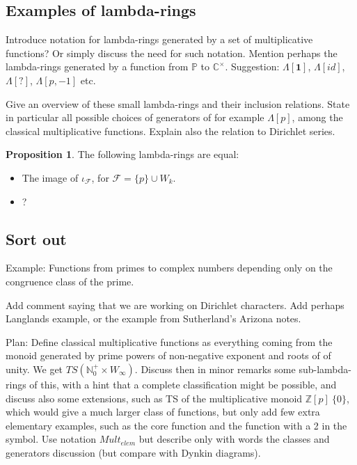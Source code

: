 \documentclass[a4paper]{article}
\theoremstyle{definition}
\newtheorem{proposition}[theorem]{Proposition}
\theoremstyle{remark}
\begin{document}
\subsection{Examples of lambda-rings}

Introduce notation for lambda-rings generated by a set of multiplicative functions? Or simply discuss the need for such notation. Mention perhaps the lambda-rings generated by a function from $\mathbb{P}$ to $\mathbb{C}^{\times}$. Suggestion: $\Lambda[\mathbf{1}]$, $\Lambda[id]$, $\Lambda[?]$, $\Lambda[p, -1]$ etc. 

Give an overview of these small lambda-rings and their inclusion relations. State in particular all possible choices of generators of for example $\Lambda[p]$, among the classical multiplicative functions. Explain also the relation to Dirichlet series.

\begin{proposition}
The following lambda-rings are equal:
\begin{itemize}
\item The image of $\iota_{\mathcal{F}}$, for $\mathcal{F} = \{ p \} \cup W_k$. 
\item ?
\end{itemize}

\end{proposition}



\subsection{Sort out}

Example: Functions from primes to complex numbers depending only on the congruence class of the prime.

Add comment saying that we are working on Dirichlet characters. Add perhaps Langlands example, or the example from Sutherland's Arizona notes.


Plan: Define classical multiplicative functions as everything coming from the monoid generated by prime powers of non-negative exponent and roots of of unity. We get $TS(\mathbb{N}_0^{+} \times W_{\infty})$. Discuss then in minor remarks some sub-lambda-rings of this, with a hint that a complete classification might be possible, and discuss also some extensions, such as TS of the multiplicative monoid $\mathbb{Z}[p] \ \{0\}$, which would give a much larger class of functions, but only add few extra elementary examples, such as the core function and the function with a 2 in the symbol. Use notation $Mult_{elem}$ but describe only with words the classes and generators discussion (but compare with Dynkin diagrams). 
\end{document}
